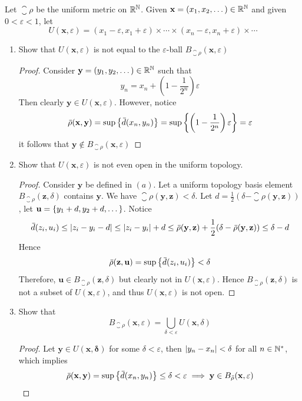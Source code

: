 \documentclass[12pt,a4paper]{article}
\begin{document}
    \begin{ex}
        Let $\closure{\rho}$ be the uniform metric on $\mathbb{R}^{\mathbb{N}}$. Given $\mathbf{x}=(x_1,x_2,\dots)\in\mathbb{R}^{\mathbb{N}}$ and given $0<\varepsilon<1$, let 
        $$
        U(\mathbf{x},\varepsilon)=(x_1-\varepsilon,x_1+\varepsilon)\times\cdots\times(x_n-\varepsilon,x_n+\varepsilon)\times\cdots
        $$
        \begin{enumerate}[label=(\alph*)]
            \item Show that $U(\mathbf{x},\varepsilon)$ is not equal to the $\varepsilon$-ball $B_{\closure{\rho}}(\mathbf{x},\varepsilon)$
            \begin{proof}
                Consider $\mathbf{y}=(y_1,y_2,\dots)\in\mathbb{R}^{\mathbb{N}}$ such that 
                $$
                y_n=x_n+\left(1-\frac{1}{2^n}\right)\varepsilon
                $$
                Then clearly $\mathbf{y}\in U(\mathbf{x},\varepsilon)$. However, notice
                $$
                {}\mkern3mu\overline{\mkern-3mu\rho}(\mathbf{x},\mathbf{y})=\sup\left\{{}\mkern3mu\overline{\mkern-3mud}(x_n,y_n)\right\}=\sup\left\{\left(1-\frac{1}{2^n}\right)\varepsilon\right\}=\varepsilon
                $$
                it follows that $\mathbf{y}\notin B_{\closure{\rho}}(\mathbf{x},\varepsilon)$
            \end{proof}
            \item Show that $U(\mathbf{x},\varepsilon)$ is not even open in the uniform topology.
            \begin{proof}
                Consider $\mathbf{y}$ be defined in $(a)$. Let a uniform topology basis element $B_{\closure{\rho}}(\mathbf{z},\delta)$ contains $\mathbf{y}$. We have $\closure{\rho}(\mathbf{y},\mathbf{z})<\delta$. Let $d=\frac{1}{2}(\delta-\closure{\rho}(\mathbf{y},\mathbf{z}))$, let $\mathbf{u}=\left\{y_1+d,y_2+d,\dots\right\}$. Notice 
                $$
                {}\mkern3mu\overline{\mkern-3mud}(z_i,u_i)\leq\left\lvert z_i-y_i-d\right\rvert\leq\left\lvert z_i-y_i\right\rvert+d\leq{}\mkern3mu\overline{\mkern-3mu\rho}(\mathbf{y},\mathbf{z})+\frac{1}{2}(\delta-{}\mkern3mu\overline{\mkern-3mu\rho}(\mathbf{y},\mathbf{z}))\leq\delta-d
                $$
                Hence
                $$
                {}\mkern3mu\overline{\mkern-3mu\rho}(\mathbf{z},\mathbf{u})=\sup\left\{{}\mkern3mu\overline{\mkern-3mud}(z_i,u_i)\right\}<\delta
                $$
                Therefore, $\mathbf{u}\in B_{\closure{\rho}}(\mathbf{z},\delta)$ but clearly not in $U(\mathbf{x},\varepsilon)$. Hence $B_{\closure{\rho}}(\mathbf{z},\delta)$ is not a subset of $U(\mathbf{x},\varepsilon)$, and thus $U(\mathbf{x},\varepsilon)$ is not open.
            \end{proof}
            \item Show that
            $$
            B_{\closure{\rho}}(\mathbf{x},\varepsilon)=\bigcup_{\delta<\varepsilon} U(\mathbf{x},\delta)
            $$
            \begin{proof}
                Let $\mathbf{y}\in U(\mathbf{x},\mathbf{\delta})$ for some $\delta<\varepsilon$, then $\left\lvert y_n-x_n\right\rvert<\delta$ for all $n\in\mathbb{N}^*$, which implies
                $$
                {}\mkern3mu\overline{\mkern-3mu\rho}(\mathbf{x},\mathbf{y})=\sup\left\{{}\mkern3mu\overline{\mkern-3mud}(x_n,y_n)\right\}\leq\delta<\varepsilon\implies \mathbf{y}\in B_{{}\mkern3mu\overline{\mkern-3mu\rho}}(\mathbf{x},\varepsilon)
                $$


\end{proof}
\end{enumerate}
\end{ex}
\end{document}
